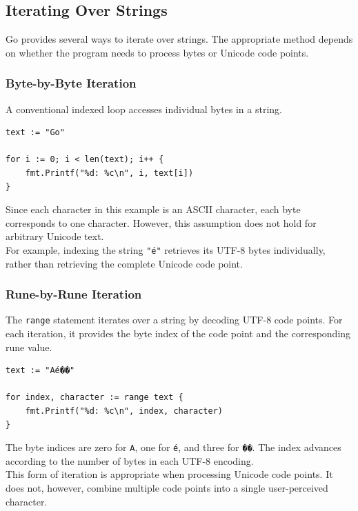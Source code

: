 \subsection{Iterating Over Strings}

Go provides several ways to iterate over strings. The appropriate method depends on whether the program needs to process bytes or Unicode code points.

\subsubsection{Byte-by-Byte Iteration}

A conventional indexed loop accesses individual bytes in a string.

\begin{lstlisting}
text := "Go"

for i := 0; i < len(text); i++ {
    fmt.Printf("%d: %c\n", i, text[i])
}
\end{lstlisting}

Since each character in this example is an ASCII character, each byte corresponds to one character. However, this assumption does not hold for arbitrary Unicode text.\\

For example, indexing the string \texttt{"é"} retrieves its UTF-8 bytes individually, rather than retrieving the complete Unicode code point.

\subsubsection{Rune-by-Rune Iteration}

The \texttt{range} statement iterates over a string by decoding UTF-8 code points. For each iteration, it provides the byte index of the code point and the corresponding rune value.

\begin{lstlisting}
text := "Aé��"

for index, character := range text {
    fmt.Printf("%d: %c\n", index, character)
}
\end{lstlisting}

The byte indices are zero for \texttt{A}, one for \texttt{é}, and three for \texttt{��}. The index advances according to the number of bytes in each UTF-8 encoding.\\

This form of iteration is appropriate when processing Unicode code points. It does not, however, combine multiple code points into a single user-perceived character.

